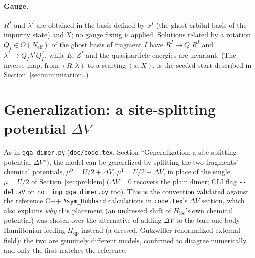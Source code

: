 \documentclass[11pt]{article}
\newcommand{\Neff}{N_{\mathrm{eff}}}
\newcommand{\Hqp}{H_{\mathrm{qp}}}
\begin{document}
\paragraph{Gauge.} $R^I$ and $\lambda^I$ are obtained in the basis defined by $x^I$ (the
ghost-orbital basis of the impurity state) and $X$; no gauge fixing is applied. Solutions
related by a rotation $Q_I\in O(\Neff)$ of the ghost basis of fragment $I$ have
$R^I\to Q_IR^I$ and $\lambda^I\to Q_I\lambda^IQ_I^{T}$, while $E$, $Z^I$ and the quasiparticle
energies are invariant. (The inverse map, from $(R,\lambda)$ to a starting $(x,X)$, is the
seeded start described in Section~\ref{sec:minimization}.)

\section{Generalization: a site-splitting potential $\Delta V$}
\label{sec:niDeltaV}

As in \texttt{gga\_dimer.py} (\texttt{doc/code.tex}, Section ``Generalization: a
site-splitting potential $\Delta V$''), the model can be generalized by splitting the
two fragments' chemical potentials, $\mu^0=U/2+\Delta V$, $\mu^1=U/2-\Delta V$, in place
of the single $\mu=U/2$ of Section~\ref{sec:problem} ($\Delta V=0$ recovers the plain
dimer; CLI flag \texttt{-{}-deltaV} on \texttt{not\_imp\_gga\_dimer.py} too). This is the
convention validated against the reference C++ \texttt{Asym\_Hubbard} calculations in
\texttt{code.tex}'s $\Delta V$ section, which also explains \emph{why} this placement
(an undressed shift of $H_{\mathrm{loc}}$'s own chemical potential) was chosen over the
alternative of adding $\Delta V$ to the bare one-body Hamiltonian feeding $\Hqp$ instead
(a dressed, Gutzwiller-renormalized external field): the two are genuinely different
models, confirmed to disagree numerically, and only the first matches the reference.
\end{document}
